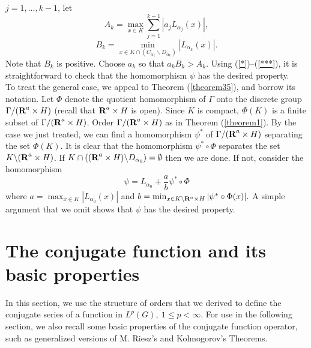 $j=1, \ldots , k-1$, 
let
%
%
$$A_k = \max_{x\in K}
\sum_{j=1}^{k-1} | a_j L_{\alpha_j}(x)|,$$	
%
%
$$B_k = \min_{x\in K \cap (C_{\alpha_k}\backslash D_{\alpha_k})} |L_{\alpha_k}(x)|.$$	
%
%
Note that $B_k$ is positive.  
%
Choose $a_k$ so that $a_k B_k >A_k$.  
%
Using (\ref{*})--(\ref{***}), 
it is straightforward to check that 
the homomorphism $\psi$ has the desired property.\\
To treat the general case, 
we appeal to Theorem (\ref{theorem35}), 
and borrow its notation.  Let $\Phi$ denote 
the quotient homomorphism of $\Gamma$ 
onto the discrete group $\Gamma/ (\R^a\times H)$
(recall that $\R^a\times H$ is open).  
%
Since $K$ is compact, $\Phi (K)$
is a finite subset of  $\Gamma/ (\R^a\times H)$.
%
Order $\Gamma/ (\R^a\times H)$ as 
in Theorem (\ref{theorem1}).  
%
By the case we just treated, 
we can find a homomorphism $\psi^*$ of 
$\Gamma/ (\R^a\times H)$ separating 
the set $\Phi (K)$.  
%
It is clear that the 
homomorphism $\psi^*\circ\Phi$ 
separates the set $K\backslash (\R^a\times H)$.  
%
If $K\cap ((\R^a\times H)\backslash 
D_{\alpha_0})=\emptyset$ then we are done.  
%
If not, consider the homomorphism 
%
$$\psi = L_{\alpha_0}  + \frac{a}{b} \psi^*\circ\Phi  $$
%
%
where $a=\max_{x\in K}|L_{\alpha_0} (x)|$ and 
$b=\min_{x\in K\backslash \R^a\times H}|\psi^*\circ\Phi (x) |.$
%
%
A simple argument that we omit shows that 
$\psi$ has the desired property.






\section{The conjugate function and its basic properties}

\newtheorem{ergodic-hilbert-transform}{Theorem}[section]
\newtheorem{generalized-m-riesz}[ergodic-hilbert-transform]{Theorem}
\newtheorem{generalized-kolmogorov}[ergodic-hilbert-transform]{Theorem}
\newtheorem{conjugate-of-slice}[ergodic-hilbert-transform]{Theorem}
In this section, we use the structure of orders
that we derived to define the 
conjugate series of a function in 
$L^p(G), \ 1\leq p <\infty$.
For use in the following section, we also recall some basic properties of the 
conjugate function operator, such as generalized versions
 of M. Riesz's and Kolmogorov's Theorems.

